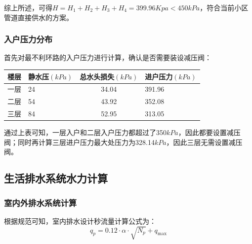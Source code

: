 \documentclass{gdutart}
\begin{document}
        综上所述，可得$H = H_1 + H_2 + H_3 + H_4 = 399.96Kpa < 450kPa$，符合当前小区管道直接供水的方案。

      \subsubsection{入户压力分布}
        首先对最不利环路的入户压力进行计算，确认是否需要装设减压阀：
        \begin{center}
          \begin{tabularx}{\textwidth}{|Y|Y|c|Y|}
            \hline
            楼层 & 静水压$(kPa)$ & 总水头损失$(kPa)$ & 进户压力$(kPa)$ \bigstrut \\
            \hline
            一层 & 24  & 34.04 & 391.96 \bigstrut \\
            \hline
            二层 & 54  & 43.92 & 352.08 \bigstrut \\
            \hline
            三层 & 84  & 52.95 & 313.05 \bigstrut \\
            \hline
          \end{tabularx}
        \end{center} 

        通过上表可知，一层入户和二层入户压力都超过了350$kPa$，因此都要设置减压阀；同时再计算三层进户压力最大处压力为328.14$kPa$，因此三层无需设置减压阀。
        \newpage

    \subsection{生活排水系统水力计算}
      \subsubsection{室内外排水系统计算}
        根据规范可知，室内排水设计秒流量计算公式为：
        \begin{equation}
          {q_p} = 0.12 \cdot \alpha  \cdot \sqrt {{N_p}}  + {q_{\max }}
        \end{equation}
        
\end{document}
